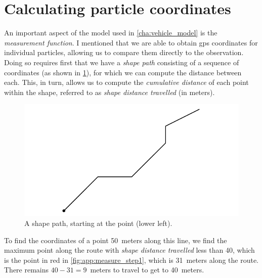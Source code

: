 \section{Calculating particle coordinates}
\label{app:pf_measurement_fun}

An important aspect of the model used in \cref{cha:vehicle_model} is the \emph{measurement function}. I mentioned that we are able to obtain \gls{gps} coordinates for individual particles, allowing us to compare them directly to the observation. Doing so requires first that we have a \emph{shape path} consisting of a sequence of coordinates (as shown in \cref{fig:app:route_shape}), for which we can compute the distance between each. This, in turn, allows us to compute the \emph{cumulative distance} of each point within the shape, referred to as \emph{shape distance travelled} (in meters).

\begin{knitrout}\small
{}\color{fgcolor}\begin{figure}[h]

{\centering \includegraphics[width=.6\textwidth]{figure/app:route_shape-1} 

}

\caption[A shape path, starting at the point (lower left)]{A shape path, starting at the point (lower left).}\label{fig:app:route_shape}
\end{figure}


\end{knitrout}

To find the coordinates of a point 50~meters along this line, we find the maximum point along the route with \emph{shape distance travelled} less than 40, which is the point in red in \cref{fig:app:measure_step1}, which is 31~meters along the route. There remains $40-31=9$~meters to travel to get to 40~meters.

